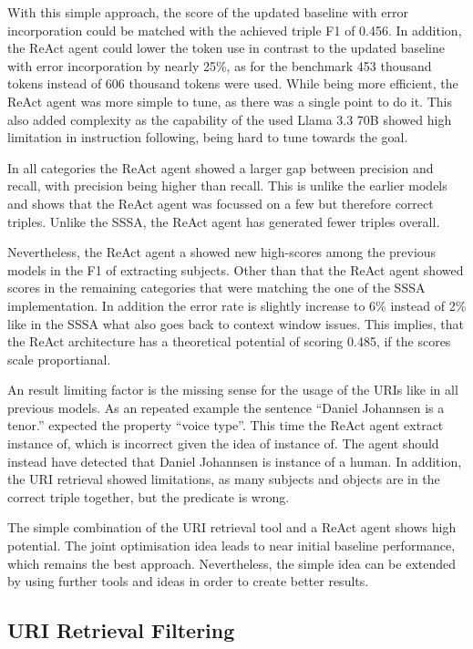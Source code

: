 \documentclass[a4paper,oneside,bibliography=totoc]{scrbook}
\begin{document}
With this simple approach, the score of the updated baseline with error incorporation could be matched with the achieved triple F1 of 0.456. In addition, the ReAct agent could lower the token use in contrast to the updated baseline with error incorporation by nearly 25\%, as for the benchmark 453 thousand tokens instead of 606 thousand tokens were used. While being more efficient, the ReAct agent was more simple to tune, as there was a single point to do it. This also added complexity as the capability of the used Llama 3.3 70B showed high limitation in instruction following, being hard to tune towards the goal.

In all categories the ReAct agent showed a larger gap between precision and recall, with precision being higher than recall. This is unlike the earlier models and shows that the ReAct agent was focussed on a few but therefore correct triples. Unlike the \ac{SSSA}, the ReAct agent has generated fewer triples overall.

Nevertheless, the ReAct agent a showed new high-scores among the previous models in the F1 of extracting subjects. Other than that the ReAct agent showed scores in the remaining categories that were matching the one of the \ac{SSSA} implementation. In addition the error rate is slightly increase to 6\% instead of 2\% like in the \ac{SSSA} what also goes back to context window issues. This implies, that the ReAct architecture has a theoretical potential of scoring 0.485, if the scores scale proportianal.

An result limiting factor is the missing sense for the usage of the URIs like in all previous models. As an repeated example the sentence \enquote{Daniel Johannsen is a tenor.} expected the property \enquote{voice type}. This time the ReAct agent extract instance of, which is incorrect given the idea of instance of. The agent should instead have detected that Daniel Johannsen is instance of a human. In addition, the URI retrieval showed limitations, as many subjects and objects are in the correct triple together, but the predicate is wrong.

The simple combination of the URI retrieval tool and a ReAct agent shows high potential. The joint optimisation idea leads to near initial baseline performance, which remains the best approach. Nevertheless, the simple idea can be extended by using further tools and ideas in order to create better results.

\subsection{URI Retrieval Filtering}
\label{subsec:uri_retrieval_filtering}
\end{document}
